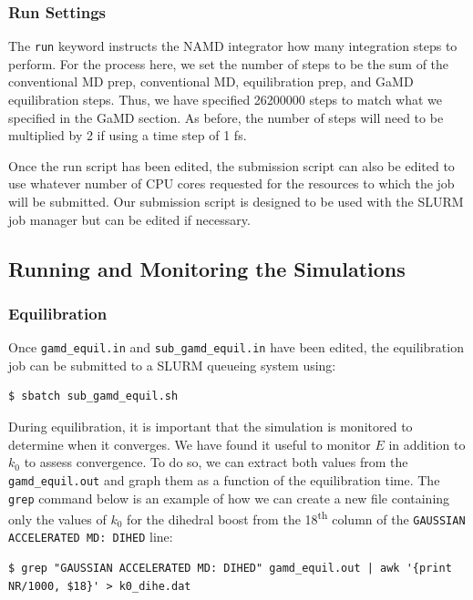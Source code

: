 \documentclass[9pt,tutorial,pubversion]{livecoms}
\begin{document}
\subsubsection{Run Settings}
The \texttt{run} keyword instructs the NAMD integrator how many integration steps to perform. For the process here, we set the number of steps to be the sum of the conventional MD prep, conventional MD, equilibration prep, and GaMD equilibration steps. Thus, we have specified 26200000 steps to match what we specified in the GaMD section. As before, the number of steps will need to be multiplied by 2 if using a time step of 1 fs. 

Once the run script has been edited, the submission script can also be edited to use whatever number of CPU cores requested for the resources to which the job will be submitted. Our submission script is designed to be used with the SLURM job manager but can be edited if necessary.

\subsection{Running and Monitoring the Simulations}
\subsubsection{Equilibration} \label{ss:tutorial_equil}
Once \texttt{gamd\_equil.in} and \texttt{sub\_gamd\_equil.in} have been edited, the equilibration job can be submitted to a SLURM queueing system using:

\begin{lstlisting}[style=MyBash]
$ sbatch sub_gamd_equil.sh
\end{lstlisting}

During equilibration, it is important that the simulation is monitored to determine when it converges. We have found it useful to monitor $E$ in addition to $k_{0}$ to assess convergence. To do so, we can extract both values from the \texttt{gamd\_equil.out} and graph them as a function of the equilibration time. The \texttt{grep} command below is an example of how we can create a new file containing only the values of $k_{0}$ for the dihedral boost from the 18\textsuperscript{th} column of the \texttt{GAUSSIAN ACCELERATED MD: DIHED} line: 

\begin{lstlisting}[style=MyBash]
$ grep "GAUSSIAN ACCELERATED MD: DIHED" gamd_equil.out | awk '{print NR/1000, $18}' > k0_dihe.dat
\end{lstlisting}
\end{document}
